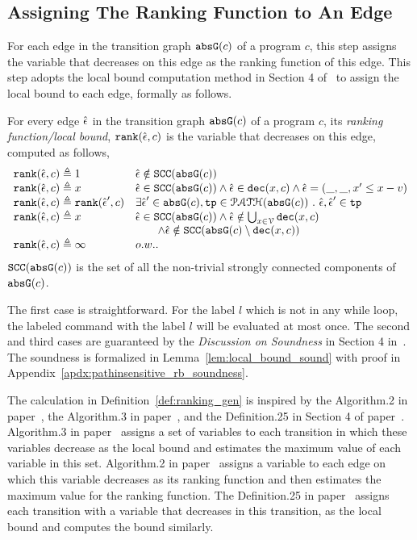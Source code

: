  \subsection{Assigning The Ranking Function to An Edge}
 For each edge in the transition graph $\mathtt{abs}{\mathtt{G}}(c)$ of a program $c$,
 this step assigns the variable that decreases on this edge as the ranking function of this edge.
 This step adopts the local bound computation method in Section 4 of~\cite{SinnZV17} to assign the local bound to each edge,
 formally as follows.
 \begin{defn}
 \label{def:ranking_gen}
 For every edge $\hat{\mathtt{\epsilon}{}}$ in the transition graph $\mathtt{abs}{\mathtt{G}}(c)$ of a program $c$,
 its \emph{ranking function/local bound}, $\mathtt{rank}(\hat{\mathtt{\epsilon}{}}, c)$
 is the variable that decreases on this edge, computed as follows,
 \[ 
\begin{array}{ll}
 \mathtt{rank}(\hat{\mathtt{\epsilon}{}}, c) \triangleq 1 
 & \hat{\mathtt{\epsilon}{}} \notin \mathtt{SCC}(\mathtt{abs}{\mathtt{G}}(c))
 \\
 \mathtt{rank}(\hat{\mathtt{\epsilon}{}}, c) \triangleq x
 & \hat{\mathtt{\epsilon}{}} \in \mathtt{SCC}(\mathtt{abs}{\mathtt{G}}(c)) \land \hat{\mathtt{\epsilon}{}} \in \mathtt{dec}(x, c) \land \hat{\mathtt{\epsilon}{}} = (\_, \_ , x' \leq x - v) \\
 \mathtt{rank}(\hat{\mathtt{\epsilon}{}}, c) \triangleq \mathtt{rank}(\hat{\mathtt{\epsilon}{}}', c)
 & \exists \hat{\mathtt{\epsilon}{}}' \in \mathtt{abs}{\mathtt{G}}(c), \mathtt{tp} \in \mathcal{PATH}( \mathtt{abs}{\mathtt{G}}(c)) ~.~ \hat{\mathtt{\epsilon}{}}, \hat{\mathtt{\epsilon}{}}' \in \mathtt{tp} \\
 \mathtt{rank}(\hat{\mathtt{\epsilon}{}}, c) \triangleq x
 & \hat{\mathtt{\epsilon}{}} \in \mathtt{SCC}(\mathtt{abs}{\mathtt{G}}(c)) \land 
 \hat{\mathtt{\epsilon}{}} \notin \bigcup_{x \in \mathcal{V}} \mathtt{dec}(x, c) \\
 & \qquad \land \hat{\mathtt{\epsilon}{}} \notin \mathtt{SCC}(\mathtt{abs}{\mathtt{G}}(c) \setminus \mathtt{dec}(x, c))\\
 \mathtt{rank}(\hat{\mathtt{\epsilon}{}}, c) \triangleq \infty
 & o.w..
\end{array}
\]
 $\mathtt{SCC}(\mathtt{abs}{\mathtt{G}}(c))$ is the set of all the non-trivial strongly connected components of $\mathtt{abs}{\mathtt{G}}(c)$.
 \end{defn}
 The first case is straightforward. 
 For the label $l$ which is not in any while loop, 
 the labeled command with the label $l$ will be 
 evaluated at most once. 
 The second and third cases are guaranteed by the \emph{Discussion on Soundness} in Section 4 in~\cite{SinnZV17}.
 The soundness is formalized in Lemma~\ref{lem:local_bound_sound} with proof in Appendix~\ref{apdx:pathinsensitive_rb_soundness}.

The calculation in Definition~\ref{def:ranking_gen} is inspired by the Algorithm.2 in paper~\cite{SinnZV14},
 the Algorithm.3 in paper~\cite{ZulegerGSV11},
 and the Definition.25 in Section 4 of paper~\cite{SinnZV17}.
 Algorithm.3 in paper~\cite{ZulegerGSV11} assigns a set of variables to each transition in which these variables decrease as the local bound
 and estimates the maximum value of each variable in this set.
 Algorithm.2 in paper~\cite{SinnZV14} assigns a variable to each edge on which this variable decreases as its ranking function
 and then estimates the maximum value for the ranking function.
 The Definition.25 in paper~\cite{SinnZV17}
 assigns each transition with a variable that decreases in this transition, as the local bound and computes the bound similarly.

